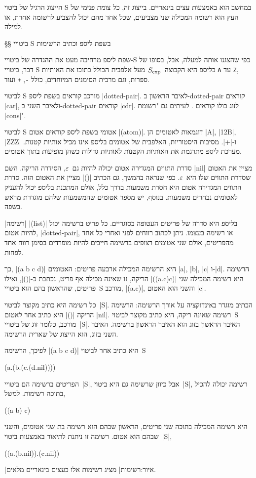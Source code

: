 הייצוג הרגיל של ביטוי S במחשב הוא באמצעות עצים בינאריים. בייצוג זה, כל צומת
פנימי של העץ הוא רשומה המכילה שני מצביעים, שכל אחד מהם יכול להצביע לרשומה אחרת,
או למילה.

§§ ביטויי S בשפת ליספ וכתיב הרשימות

שפת ליספ מרחיבה מעט את ההגדרה של ביטויי-S כפי שהצגנו אותה למעלה, אבל, בסופו של
דבר, ביטויי S בליספ היא הקבוצה~$S_{\text{exp}}$ מעל אלפבית הכולל בתוכו את האותיות
\texttt{A} עד \texttt{Z}, ספרות, וגם מרבית הסימנים המיוחדים, כולל \texttt{-},
\texttt{+} ועוד.

לביטוי S מורכב קוראים בשפת ליספ \E|dotted-pair|. לאיבר הראשון ב-dotted-pair
קוראים \E|car|, ולאיבר השני ב-dotted-pair קוראים \E|cdr|. לזוג כולו קוראים
.
לעיתים גם "רשומת \E|cons|".

לביטוי S אטומי בשפת ליספ קוראים אטום \E|(atom)|. דוגמאות לאטומים הן \E|A|,
\E|12B|, \E|ZZZ| ו-\E|+|. מסיבות היסטוריות, האלפבית של אטומים בליספ אינו מכיל
אותיות קטנות. מערכת ליספ מתרגמת את האותיות הקטנות לאותיות גדולות כשהן מופיעות
בתוך אטומים.

סדרת התווים המגדירה אטום יכולה להיות גם~$ε$, הסידרה הריקה. השם \E|nil| מציין את
האטום שסדרת התווים שלו היא~$ε$. כפי שנראה בהמשך, גם הכתיב \E|()| מציין את האטום
הזה. סדרת התווים המגדירה אטום היא חסרת משמעות בדרך כלל, אולם המתכנת בליספ יכול
להעניק לאטומים נבחרים משמעות. בנוסף, יש מספר אטומים שהמשמעות שלהם מוגדרת מראש
בשפה.

\ע|רשימה| \E|(list)| בליספ היא סדרה של פריטים העטופה בסוגריים. כל פריט ברשימה
יכול להיות אטום, \E|dotted-pair|, או רשימה בעצמו. ניתן לכתוב רווחים לפני ואחרי
כל אחד מהפריטים, אולם שני אטומים רצופים ברשימה חייבים להיות מופרדים בסימן רווח
אחד לפחות.

כך, \E|(a b c d)| היא הרשימה המכילה ארבעה פריטים: האטומים \E|a|, \E|b|, \E|c|
ו-\E|d|. הרשימה הריקה, זו שאינה מכילה אף פריט, נכתבת כ-\E|()|, ואילו
\E|((a.c)c)| היא רשימה המכילה שני פריטים, שהראשון בהם הוא ביטויי~S מורכב,
\E|(a.c)|, והשני הוא האטום \E|c|.

כל רשימה היא כתיב מקוצר לביטוי~\E|S|. הכתיב מוגדר באינדוקציה על אורך הרשימה:
הרשימה הריקה \E|()| היא כתיב אחר לאטום \E|nil|. רשימה שאינה ריקה, היא כתיב
מקוצר לביטוי~S מורכב, כלומר זוג של ביטויי~\E|S|. האיבר הראשון בזוג הוא האיבר
הראשון ברשימה. האיבר השני בזוג, הוא הייצוג של שארית הרשימה.

לפיכך, הרשימה \E|(a b c d)| היא כתיב אחר לביטוי~S
\begin{LISP}
(a.(b.(c.(d.nil))))
\end{LISP}

הפריטים ברשימה הם ביטויי~\E|S|, אבל כיוון שרשימה גם היא ביטוי~\E|S|, רשימה
יכולה להכיל בתוכה רשימות. למשל,
\begin{LISP}
  ((a b) c)
\end{LISP}
היא רשימה המכילה בתוכה שני פריטים, הראשון שבהם הוא רשימה בת שני אטומים, והשני
שבהם הוא אטום. רשימה זו ניתנת לתיאור באמצעות ביטוי~\E|S|,
\begin{LISP}
  ((a.(b.nil)).(c.nil))
\end{LISP}
|איור:רשימות| מציג רשימות אלו כעצים בינאריים מלאים.

